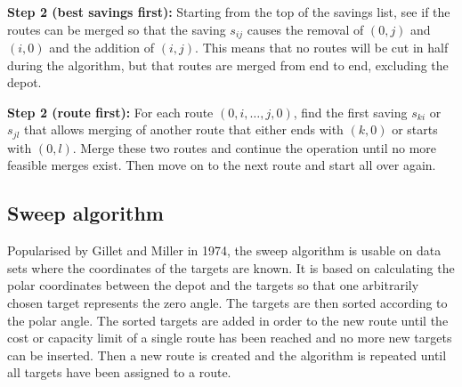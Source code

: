 \medskip
\noindent
\textbf{Step 2 (best savings first):} Starting from the top of the savings list, see if the routes can be merged so that the saving $s_{ij}$ causes the removal of $(0, j)$ and $(i, 0)$ and the addition of $(i, j)$. \cite{reimann2004d} This means that no routes will be cut in half during the algorithm, but that routes are merged from end to end, excluding the depot.

\medskip
\noindent
\textbf{Step 2 (route first):} For each route $(0, i, \ldots, j, 0)$, find the first saving $s_{ki}$ or $s_{jl}$ that allows merging of another route that either ends with $(k, 0)$ or starts with $(0, l)$. Merge these two routes and continue the operation until no more feasible merges exist. Then move on to the next route and start all over again. \cite{laporte2000classical}

 



\subsection{Sweep algorithm}	


Popularised by Gillet and Miller in 1974, the sweep algorithm is usable on data sets where the coordinates of the targets are known. It is based on calculating the polar coordinates between the depot and the targets so that one arbitrarily chosen target represents the zero angle. The targets are then sorted according to the polar angle. The sorted targets are added in order to the new route until the cost or capacity limit of a single route has been reached and no more new targets can be inserted. Then a new route is created and the algorithm is repeated until all targets have been assigned to a route. \cite{gillett1974heuristic}

